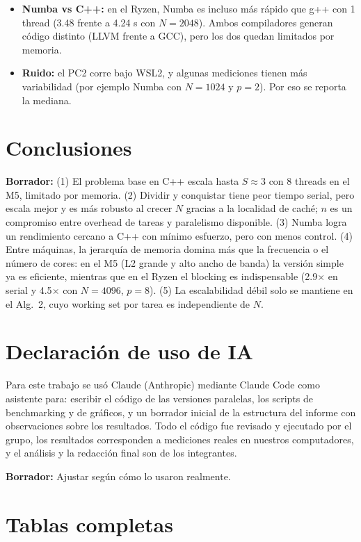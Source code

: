 \documentclass[11pt,a4paper]{article}
\newcommand{\pcA}{pc1-mac}
\newcommand{\pcB}{pc2-ubuntu}
\newcommand{\nota}[1]{\par\noindent\colorbox{yellow!25}{\parbox{\dimexpr\linewidth-2\fboxsep}{\small\textbf{Borrador:} #1}}\par}
\begin{document}
{\begin{itemize}
\item \textbf{Numba vs C++:} en el Ryzen, Numba es incluso más rápido que g++ con 1 thread (3.48 frente a 4.24 s con $N=2048$). Ambos compiladores generan código distinto (LLVM frente a GCC), pero los dos quedan limitados por memoria.
\item \textbf{Ruido:} el PC2 corre bajo WSL2, y algunas mediciones tienen más variabilidad (por ejemplo Numba con $N=1024$ y $p=2$). Por eso se reporta la mediana.
\end{itemize}}

\section{Conclusiones}
\nota{(1) El problema base en C++ escala hasta $S\approx3$ con 8 threads en el M5, limitado por memoria. (2) Dividir y conquistar tiene peor tiempo serial, pero escala mejor y es más robusto al crecer $N$ gracias a la localidad de caché; $n$ es un compromiso entre overhead de tareas y paralelismo disponible. (3) Numba logra un rendimiento cercano a C++ con mínimo esfuerzo, pero con menos control. (4) Entre máquinas, la jerarquía de memoria domina más que la frecuencia o el número de cores: en el M5 (L2 grande y alto ancho de banda) la versión simple ya es eficiente, mientras que en el Ryzen el blocking es indispensable (2.9$\times$ en serial y 4.5$\times$ con $N=4096$, $p=8$). (5) La escalabilidad débil solo se mantiene en el Alg.~2, cuyo working set por tarea es independiente de $N$.}

\section*{Declaración de uso de IA}
Para este trabajo se usó Claude (Anthropic) mediante Claude Code como asistente para: escribir el código de las versiones paralelas, los scripts de benchmarking y de gráficos, y un borrador inicial de la estructura del informe con observaciones sobre los resultados. Todo el código fue revisado y ejecutado por el grupo, los resultados corresponden a mediciones reales en nuestros computadores, y el análisis y la redacción final son de los integrantes.
\nota{Ajustar según cómo lo usaron realmente.}

\appendix
\section{Tablas completas}



\end{document}
